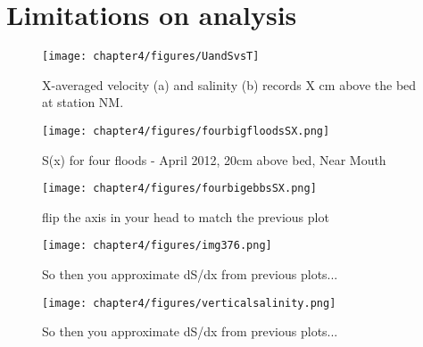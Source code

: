 \section{Limitations on analysis}


\begin{figure}
	\texttt{[image: chapter4/figures/UandSvsT]} 
\caption{X-averaged velocity (a) and salinity (b) records X cm above the bed at station NM.} \label{fig:UandSvsTch4}
\end{figure}

\begin{figure}
	\texttt{[image: chapter4/figures/fourbigfloodsSX.png]} 
\caption{S(x) for four floods - April 2012, 20cm above bed, Near Mouth} \label{fig:fourfloods}
\end{figure}


\begin{figure}
	\texttt{[image: chapter4/figures/fourbigebbsSX.png]} \caption{flip the axis in your head to match the previous plot} \label{fig:fourebbs}
\end{figure}

\begin{figure}
	\texttt{[image: chapter4/figures/img376.png]} \caption{So then you approximate dS/dx from previous plots...} \label{fig:fourebbs}
\end{figure}


\begin{figure}
	\texttt{[image: chapter4/figures/verticalsalinity.png]} \caption{So then you approximate dS/dx from previous plots...} \label{fig:fourebbs}
\end{figure}

